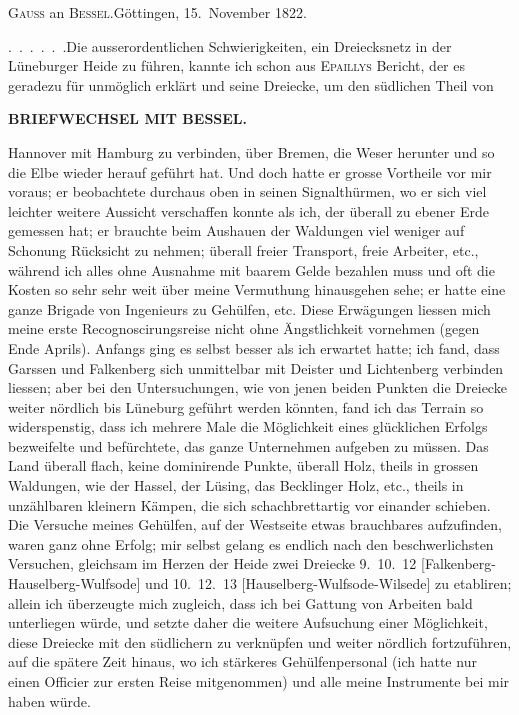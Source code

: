 \begin{center}
\textsc{Gauss} an \textsc{Bessel}.\quad Göttingen, 15.~November 1822.
\end{center}

\begingroup
\makeatletter
\renewcommand{\@makefnmark}{\hbox{\normalfont\textsuperscript{*})}}
\long{}
\makeatother
\par\noindent\hspace*{\parindent}.\ .\ .\ .\ .\ .\quad Die ausserordentlichen Schwierigkeiten, ein Dreiecksnetz in der Lüneburger Heide zu führen, kannte ich schon aus \textsc{Epaillys} Bericht, der es geradezu für unmöglich erklärt und seine Dreiecke, um den südlichen Theil von
\par\clearpage
{}\hfill{\small\textbf{BRIEFWECHSEL MIT BESSEL.}}\par\medskip
\noindent Hannover mit Hamburg zu verbinden, über Bremen, die Weser herunter und so die Elbe wieder herauf geführt hat.
Und doch hatte er grosse Vortheile vor mir voraus; er beobachtete durchaus oben in seinen Signalthürmen, wo er sich viel leichter weitere Aussicht verschaffen konnte als ich, der überall zu ebener Erde gemessen hat; er brauchte beim Aushauen der Waldungen viel weniger auf Schonung Rücksicht zu nehmen; überall freier Transport, freie Arbeiter, etc., während ich alles ohne Ausnahme mit baarem Gelde bezahlen muss und oft die Kosten so sehr sehr weit über meine Vermuthung hinausgehen sehe; er hatte eine ganze Brigade von Ingenieurs zu Gehülfen, etc.
Diese Erwägungen liessen mich meine erste Recognoscirungsreise nicht ohne Ängstlichkeit vornehmen (gegen Ende Aprils).
Anfangs ging es selbst besser als ich erwartet hatte; ich fand, dass Garssen und Falkenberg sich unmittelbar mit Deister und Lichtenberg verbinden liessen; aber bei den Untersuchungen, wie von jenen beiden Punkten die Dreiecke weiter nördlich bis Lüneburg geführt werden könnten, fand ich das Terrain so widerspenstig, dass ich mehrere Male die Möglichkeit eines glücklichen Erfolgs bezweifelte und befürchtete, das ganze Unternehmen aufgeben zu müssen.
Das Land überall flach, keine dominirende Punkte, überall Holz, theils in grossen Waldungen, wie der Hassel, der Lüsing, das Becklinger Holz, etc., theils in unzählbaren kleinern Kämpen, die sich schachbrettartig vor einander schieben.
Die Versuche meines Gehülfen, auf der Westseite etwas brauchbares aufzufinden, waren ganz ohne Erfolg; mir selbst gelang es endlich nach den beschwerlichsten Versuchen, gleichsam im Herzen der Heide zwei Dreiecke 9.~10.~12 [Falkenberg-Hauselberg-Wulfsode] und 10.~12.~13 [Hauselberg-Wulfsode-Wilsede] zu etabliren; allein ich überzeugte mich zugleich, dass ich bei  Gattung von Arbeiten bald unterliegen würde, und setzte daher die weitere Aufsuchung einer Möglichkeit, diese Dreiecke mit den südlichern zu verknüpfen und weiter nördlich fortzuführen, auf die spätere Zeit hinaus, wo ich stärkeres Gehülfenpersonal (ich hatte nur einen Officier zur ersten Reise mitgenommen) und alle meine Instrumente bei mir haben würde.

